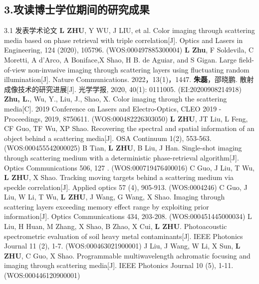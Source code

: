 \begin{resume}
\section*{3.\hspace{0.75em}攻读博士学位期间的研究成果}
\begin{resumelist}{\hspace{-0.25em}3.1\hspace{0.5em} 发表学术论文}
\resumelistitem \textbf{L ZHU}, Y WU, J LIU, et al. Color imaging through scattering media based on phase retrieval with triple correlation[J]. Optics and Lasers in Engineering, 124 (2020), 105796. (WOS:000497885300004)
\resumelistitem \textbf{L Zhu}, F Soldevila, C Moretti, A d'Arco, A Boniface,X Shao, H B. de Aguiar, and S Gigan. Large field-of-view non-invasive imaging through scattering layers using fluctuating random illumination[J]. Nature Communications. 2022，13(1)，1447.
\resumelistitem \textbf{朱磊}，邵晓鹏. 散射成像技术的研究进展[J]. 光学学报, 2020, 40(1): 0111005. (EI:20200908214918)
\resumelistitem \textbf{Zhu, L.}, Wu, Y., Liu, J., Shao, X. Color imaging through the scattering media[C]. 2019 Conference on Lasers and Electro-Optics, CLEO 2019 - Proceedings, 2019, 8750611. (WOS:000482226303050)
\resumelistitem \textbf{L ZHU}, JT Liu, L Feng, CF Guo, TF Wu, XP Shao. Recovering the spectral and spatial information of an object behind a scattering media[J]. OSA Continuum 1(2), 553-563. (WOS:000455542000025)
\resumelistitem B Tian, \textbf{L ZHU}, B Liu, J Han. Single-shot imaging through scattering medium with a deterministic phase-retrieval algorithm[J]. Optics Communications 506, 127 . (WOS:000719476400016)
\resumelistitem C Guo, J Liu, T Wu, \textbf{L ZHU}, X Shao. Tracking moving targets behind a scattering medium via speckle correlation[J]. Applied optics 57 (4), 905-913. (WOS:0004246)
\resumelistitem C Guo, J Liu, W Li, T Wu, \textbf{L ZHU}, J Wang, G Wang, X Shao. Imaging through scattering layers exceeding memory effect range by exploiting prior information[J]. Optics Communications 434, 203-208. (WOS:000451445000034)
\resumelistitem L Liu, H Huan, M Zhang, X Shao, B Zhao, X Cui, \textbf{L ZHU}. Photoacoustic spectrometric evaluation of soil heavy metal contaminants[J]. IEEE Photonics Journal 11 (2), 1-7. (WOS:000463021900001)
\resumelistitem J Liu, J Wang, W Li, X Sun, \textbf{L ZHU}, C Guo, X Shao. Programmable multiwavelength achromatic focusing and imaging through scattering media[J]. IEEE Photonics Journal 10 (5), 1-11. (WOS:000446120900001)
\end{resumelist}


\end{resume}
